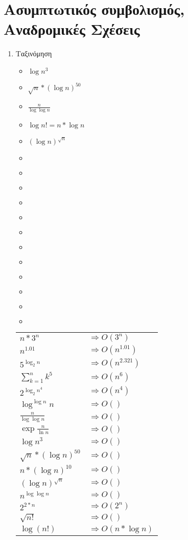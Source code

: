 \documentclass[a4paper,10pt]{article} \usepackage{anysize}
\begin{document}
\renewcommand{\labelenumi}{\alph{enumi}}
\renewcommand{\labelenumii}{(\roman{enumii})}



\section{Ασυμπτωτικός συμβολισμός, Αναδρομικές
Σχέσεις} \setcounter{section}{1}
\begin{enumerate}
\item Ταξινόμηση\\
\begin{itemize}
\item $\log {n^3}$
\item $\sqrt{n}*(\log{n})^{50}$
\item $\frac{n}{\log{\log{n}}} $
\item $\log{n!}=n*\log{n} $
\item $(\log {n})^{\sqrt{n}} $
\item $ $
\item $ $
\item $ $
\item $ $
\item $ $
\item $ $
\item $ $
\item $ $
\item $ $
\item $ $
\item $ $
\item $ $
\end{itemize}
\begin{tabular}{l l}
$ n*3^n$ & $\Rightarrow O(3^n)$ \\
$ n^{1.01}$ & $\Rightarrow O(n^{1.01})$\\
$ 5^{\log _2 {n}}$ & $\Rightarrow O(n^{2.321})$\\
$ \sum_{k=1}^{n}k^5$ & $\Rightarrow O(n^6)$\\
$ 2^{{\log _2 {n}}^4}$ & $\Rightarrow O(n^4)$\\
$ {\log^{\log{n}}{n}}$ & $\Rightarrow O()$\\
$ \frac{n}{\log\log{n}}$ & $\Rightarrow O()$\\
$ \exp{\frac{n}{\ln{n}}}$ & $\Rightarrow O()$\\
$ \log{n^3}$ & $\Rightarrow O()$\\
$ \sqrt{n}*(\log{n})^{50}$ & $\Rightarrow O()$\\
$ n*(\log{n})^{10}$ & $\Rightarrow O()$\\
$ (\log{n})^{\sqrt{n}}$ & $\Rightarrow O()$\\
$ n^{\log{\log{n}}}$ & $\Rightarrow O()$\\
$ 2^{2*n}$ & $\Rightarrow O(2^{n})$\\
$ \sqrt{n!}$ & $\Rightarrow O()$\\
$ \log{(n!)}$ & $\Rightarrow O(n*\log{n})$\\


\end{tabular}
\end{enumerate}
\end{document}
